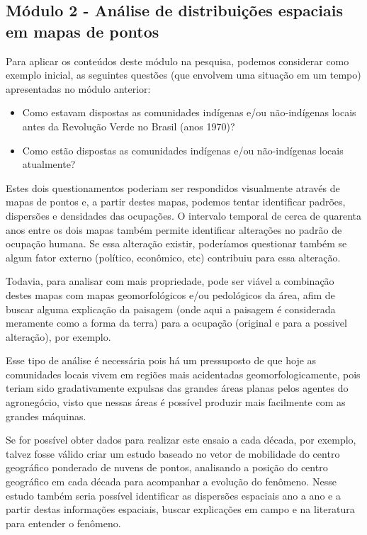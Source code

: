 \subsection{Módulo 2 - Análise de distribuições espaciais em mapas de pontos}

Para aplicar os conteúdos deste módulo na pesquisa, podemos considerar como exemplo inicial, as seguintes questões (que envolvem uma situação em um tempo) apresentadas no módulo anterior:

\begin{itemize}
  \item Como estavam dispostas as comunidades indígenas e/ou não-indígenas locais antes da Revolução Verde no Brasil (anos 1970)?
  \item Como estão dispostas as comunidades indígenas e/ou não-indígenas locais atualmente?
\end{itemize}

Estes dois questionamentos poderiam ser respondidos visualmente através de mapas de pontos e, a partir destes mapas, podemos tentar identificar padrões, dispersões e densidades das ocupações. O intervalo temporal de cerca de quarenta anos entre os dois mapas também permite identificar alterações no padrão de ocupação humana. Se essa alteração existir, poderíamos questionar também se algum fator externo (político, econômico, etc) contribuiu para essa alteração.

Todavia, para analisar com mais propriedade, pode ser viável a combinação destes mapas com mapas geomorfológicos e/ou pedológicos da área, afim de buscar alguma explicação da paisagem (onde aqui a paisagem é considerada meramente como a forma da terra) para a ocupação (original e para a possivel alteração), por exemplo.

Esse tipo de análise é necessária pois há um pressuposto de que hoje as comunidades locais vivem em regiões mais acidentadas geomorfologicamente, pois teriam sido gradativamente expulsas das grandes áreas planas pelos agentes do agronegócio, visto que nessas áreas é possível produzir mais facilmente com as grandes máquinas. 

Se for possível obter dados para realizar este ensaio a cada década, por exemplo, talvez fosse válido criar um estudo baseado no vetor de mobilidade do centro geográfico ponderado de nuvens de pontos, analisando a posição do centro geográfico em cada década para acompanhar a evolução do fenômeno. Nesse estudo também seria possível identificar as dispersões espaciais ano a ano e a partir destas informações espaciais, buscar explicações em campo e na literatura para entender o fenômeno.

